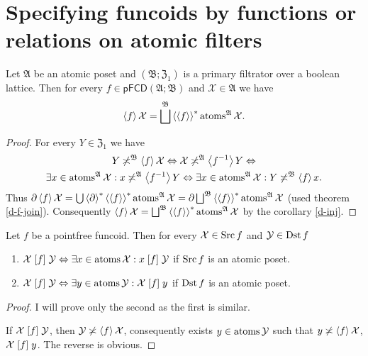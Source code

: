 \section{Specifying funcoids by functions or relations on atomic filters}
\begin{thm}
\label{spfn-atoms}Let $\mathfrak{A}$ be an atomic poset and $(\mathfrak{B};\mathfrak{Z}_{1})$
is a primary filtrator over a boolean lattice. Then for every $f\in\mathsf{pFCD}(\mathfrak{A};\mathfrak{B})$
and $\mathcal{X}\in\mathfrak{A}$ we have
\[
\left\langle f\right\rangle\mathcal{X}=\bigsqcup^{\mathfrak{B}}\left\langle \left\langle f\right\rangle\right\rangle ^{\ast}\operatorname{atoms}^{\mathfrak{A}}\mathcal{X}.
\]
\end{thm}
\begin{proof}
For every $Y\in\mathfrak{Z}_{1}$ we have
\begin{multline*}
Y\not\asymp^{\mathfrak{B}}\left\langle f\right\rangle\mathcal{X}\Leftrightarrow\mathcal{X}\not\asymp^{\mathfrak{A}}\left\langle f^{-1}\right\rangle Y\Leftrightarrow\\
\exists x\in\operatorname{atoms}^{\mathfrak{A}}\mathcal{X}:x\not\asymp^{\mathfrak{A}}\left\langle f^{-1}\right\rangle Y\Leftrightarrow\exists x\in\operatorname{atoms}^{\mathfrak{A}}\mathcal{X}:Y\not\asymp^{\mathfrak{B}}\left\langle f\right\rangle x.
\end{multline*}
Thus $\partial\left\langle f\right\rangle\mathcal{X}=\bigcup\left\langle \partial\right\rangle ^{\ast}\left\langle \left\langle f\right\rangle\right\rangle ^{\ast}\operatorname{atoms}^{\mathfrak{A}}\mathcal{X}=\partial\bigsqcup^{\mathfrak{B}}\left\langle \left\langle f\right\rangle\right\rangle ^{\ast}\operatorname{atoms}^{\mathfrak{A}}\mathcal{X}$
(used theorem \ref{d-f-join}). Consequently $\left\langle f\right\rangle\mathcal{X}=\bigsqcup^{\mathfrak{B}}\left\langle \left\langle f\right\rangle\right\rangle ^{\ast}\operatorname{atoms}^{\mathfrak{A}}\mathcal{X}$
by the corollary \ref{d-inj}.\end{proof}
\begin{prop}
Let $f$ be a pointfree funcoid. Then for every $\mathcal{X}\in\operatorname{Src} f$
and $\mathcal{Y}\in\operatorname{Dst} f$
\begin{enumerate}
\item $\mathcal{X}\mathrel{\left[f\right]}\mathcal{Y}\Leftrightarrow\exists x\in\operatorname{atoms}\mathcal{X}:x\mathrel{\left[f\right]}\mathcal{Y}$
if $\operatorname{Src} f$ is an atomic poset.
\item $\mathcal{X}\mathrel{\left[f\right]}\mathcal{Y}\Leftrightarrow\exists y\in\operatorname{atoms}\mathcal{Y}:\mathcal{X}\mathrel{\left[f\right]}y$
if $\operatorname{Dst} f$ is an atomic poset.
\end{enumerate}
\end{prop}
\begin{proof}
I will prove only the second as the first is similar.

If $\mathcal{X}\mathrel{\left[f\right]}\mathcal{Y}$, then $\mathcal{Y}\not\asymp\left\langle f\right\rangle\mathcal{X}$,
consequently exists $y\in\operatorname{atoms}\mathcal{Y}$ such that $y\not\asymp\left\langle f\right\rangle\mathcal{X}$,
$\mathcal{X}\mathrel{\left[f\right]}y$. The reverse is obvious.\end{proof}
